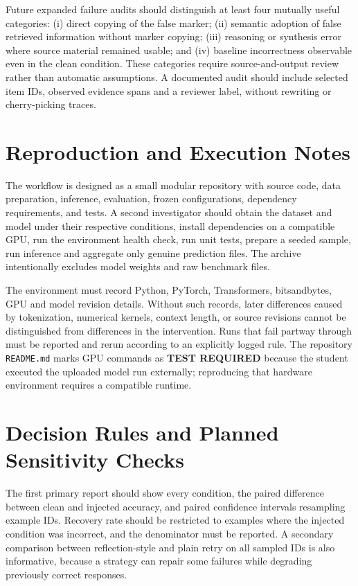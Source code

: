 \documentclass[11pt,onecolumn,journal]{IEEEtran}
\begin{document}
Future expanded failure audits should distinguish at least four mutually useful categories: (i) direct copying of the false marker; (ii) semantic adoption of false retrieved information without marker copying; (iii) reasoning or synthesis error where source material remained usable; and (iv) baseline incorrectness observable even in the clean condition. These categories require source-and-output review rather than automatic assumptions. A documented audit should include selected item IDs, observed evidence spans and a reviewer label, without rewriting or cherry-picking traces.

\section{Reproduction and Execution Notes}
The workflow is designed as a small modular repository with source code, data preparation, inference, evaluation, frozen configurations, dependency requirements, and tests. A second investigator should obtain the dataset and model under their respective conditions, install dependencies on a compatible GPU, run the environment health check, run unit tests, prepare a seeded sample, run inference and aggregate only genuine prediction files. The archive intentionally excludes model weights and raw benchmark files.

The environment must record Python, PyTorch, Transformers, bitsandbytes, GPU and model revision details. Without such records, later differences caused by tokenization, numerical kernels, context length, or source revisions cannot be distinguished from differences in the intervention. Runs that fail partway through must be reported and rerun according to an explicitly logged rule. The repository \texttt{README.md} marks GPU commands as \textbf{TEST REQUIRED} because the student executed the uploaded model run externally; reproducing that hardware environment requires a compatible runtime.

\section{Decision Rules and Planned Sensitivity Checks}
The first primary report should show every condition, the paired difference between clean and injected accuracy, and paired confidence intervals resampling example IDs. Recovery rate should be restricted to examples where the injected condition was incorrect, and the denominator must be reported. A secondary comparison between reflection-style and plain retry on all sampled IDs is also informative, because a strategy can repair some failures while degrading previously correct responses.
\end{document}
